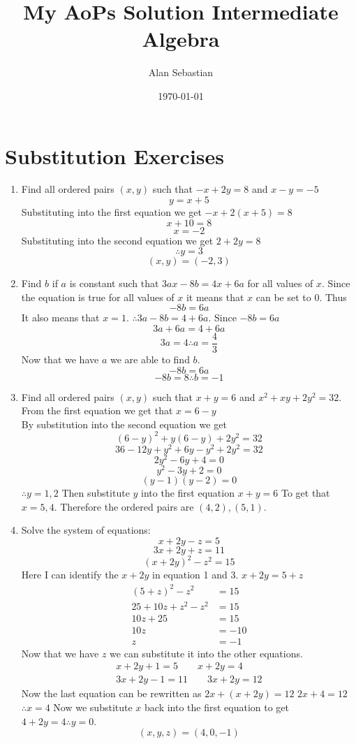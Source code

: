 \documentclass[10pt]{article}
\title{My AoPs Solution Intermediate Algebra}
\author{Alan Sebastian}
\date{\today}
\begin{document}
\maketitle
\noindent
\section{Substitution Exercises}

\begin{enumerate}
    \item Find all ordered pairs $(x,y)$ such that $-x+2y = 8$ and $x-y=-5$
    $$y=x+5$$
    Substituting into the first equation we get $-x+2(x+5)=8$
    $$x+10=8$$
    $$x=-2$$
    Substituting into the second equation we get $2+2y=8$
    $$\therefore y=3$$
    $$(x,y)=(-2,3)$$

    \item Find $b$ if $a$ is constant such that $3ax-8b=4x+6a$ for all values of $x$.
    Since the equation is true for all values of $x$ it means that $x$ can be set to 0. Thus
    $$-8b=6a$$
    It also means that $x=1$.
    $\therefore 3a-8b=4+6a$. Since $-8b = 6a$
    $$3a+6a=4+6a$$
    $$3a=4 \therefore a=\frac{4}{3}$$
    Now that we have $a$ we are able to find $b$.
    $$-8b=6a$$
    $$-8b=8 \therefore b=-1$$

    \item Find all ordered pairs $(x,y)$ such that $x+y=6$ and $x^2+xy+2y^2=32$.
    From the first equation we get that $x=6-y$ \\
    By substitution into the second equation we get
    $$(6-y)^2 + y(6-y) + 2y^2 = 32$$
    $$36-12y+y^2 + 6y-y^2 + 2y^2=32$$
    $$2y^2-6y+4=0$$
    $$y^2-3y+2=0$$
    $$(y-1)(y-2)=0$$
    $\therefore y = 1,2$
    Then substitute $y$ into the first equation $x+y=6$
    To get that $x=5,4$.
    Therefore the ordered pairs are $(4,2), (5,1)$.

    \item Solve the system of equations:
    $$x+2y-z=5$$
    $$3x+2y+z=11$$
    $$(x+2y)^2-z^2=15$$
    Here I can identify the $x+2y$ in equation 1 and 3. $x+2y=5+z$
    \begin{align}
      (5+z)^2-z^2 &=15 \\
        25+10z+z^2-z^2 &=15 \\
        10z+25 &= 15 \\
        10z &= -10 \\ 
        z &= -1
    \end{align}
    Now that we have $z$ we can substitute it into the other equations.
    \begin{gather}
        x+2y+1=5 \qquad x+2y = 4 \\
        3x+2y-1=11 \qquad 3x+2y=12
    \end{gather}
    Now the last equation can be rewritten as $2x+(x+2y)=12$
    \qquad $2x+4=12$
    $\therefore x=4$
    Now we substitute $x$ back into the first equation to get $4+2y=4 \therefore y=0$.
    $$\boxed{(x,y,z)=(4,0,-1)}$$
\end{enumerate}
\end{document}

